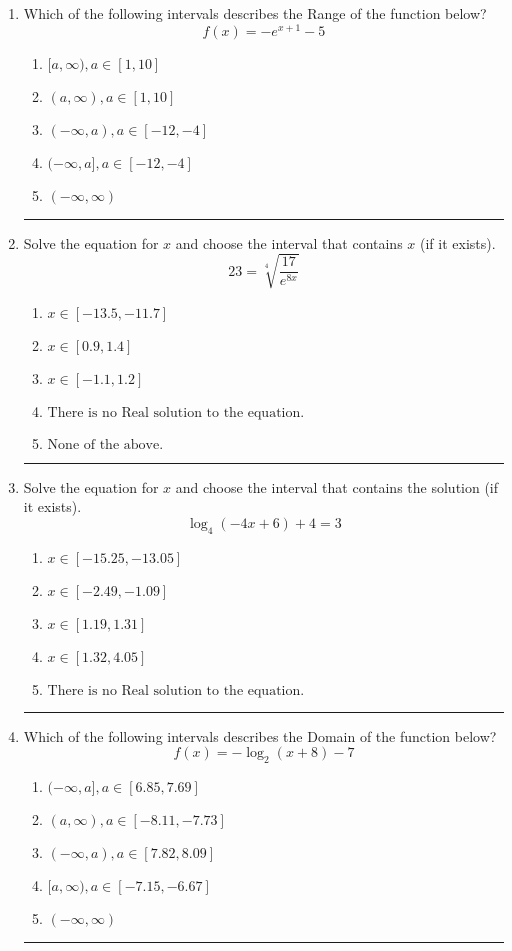 \documentclass[14pt]{extbook}
\newcommand{\litem}[1]{\item#1\hspace*{-1cm}\rule{\textwidth}{0.4pt}}
\begin{document}
\begin{enumerate}
{\begin{enumerate}[label=\Alph*.]
\end{enumerate} }
\litem{
Which of the following intervals describes the Range of the function below?\[ f(x) = -e^{x+1}-5 \]\begin{enumerate}[label=\Alph*.]
\item \( [a, \infty), a \in [1, 10] \)
\item \( (a, \infty), a \in [1, 10] \)
\item \( (-\infty, a), a \in [-12, -4] \)
\item \( (-\infty, a], a \in [-12, -4] \)
\item \( (-\infty, \infty) \)

\end{enumerate} }
\litem{
 Solve the equation for $x$ and choose the interval that contains $x$ (if it exists).\[  23 = \sqrt[4]{\frac{17}{e^{8x}}} \]\begin{enumerate}[label=\Alph*.]
\item \( x \in [-13.5, -11.7] \)
\item \( x \in [0.9, 1.4] \)
\item \( x \in [-1.1, 1.2] \)
\item \( \text{There is no Real solution to the equation.} \)
\item \( \text{None of the above.} \)

\end{enumerate} }
\litem{
Solve the equation for $x$ and choose the interval that contains the solution (if it exists).\[ \log_{4}{(-4x+6)}+4 = 3 \]\begin{enumerate}[label=\Alph*.]
\item \( x \in [-15.25, -13.05] \)
\item \( x \in [-2.49, -1.09] \)
\item \( x \in [1.19, 1.31] \)
\item \( x \in [1.32, 4.05] \)
\item \( \text{There is no Real solution to the equation.} \)

\end{enumerate} }
\litem{
Which of the following intervals describes the Domain of the function below?\[ f(x) = -\log_2{(x+8)}-7 \]\begin{enumerate}[label=\Alph*.]
\item \( (-\infty, a], a \in [6.85, 7.69] \)
\item \( (a, \infty), a \in [-8.11, -7.73] \)
\item \( (-\infty, a), a \in [7.82, 8.09] \)
\item \( [a, \infty), a \in [-7.15, -6.67] \)
\item \( (-\infty, \infty) \)


\end{enumerate}}
\end{enumerate}
\end{document}
